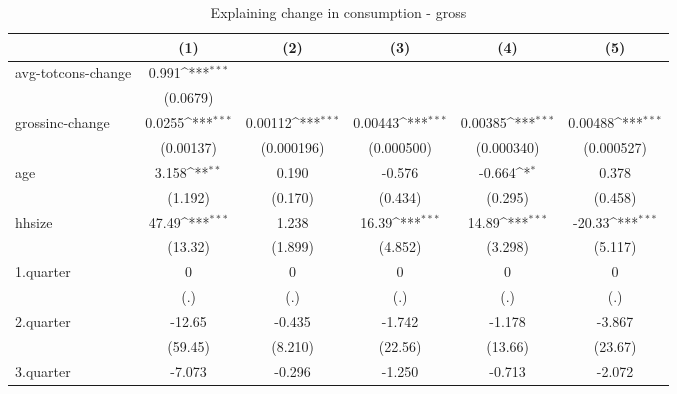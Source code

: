 \begin{table}[!h]\centering
\def\sym#1{\ifmmode^{#1}\else\(^{#1}\)\fi}
\caption{\label{tab:2.1B-deltacons-gross} Explaining change in consumption - gross}
\begin{tabular}{l*{5}{c}}
\hline\hline
            &\multicolumn{1}{c}{(1)}         &\multicolumn{1}{c}{(2)}         &\multicolumn{1}{c}{(3)}         &\multicolumn{1}{c}{(4)}         &\multicolumn{1}{c}{(5)}         \\
\hline
avg-totcons-change&       0.991\sym{***}&                     &                     &                     &                     \\
            &    (0.0679)         &                     &                     &                     &                     \\
grossinc-change&      0.0255\sym{***}&     0.00112\sym{***}&     0.00443\sym{***}&     0.00385\sym{***}&     0.00488\sym{***}\\
            &   (0.00137)         &  (0.000196)         &  (0.000500)         &  (0.000340)         &  (0.000527)         \\
age         &       3.158\sym{**} &       0.190         &      -0.576         &      -0.664\sym{*}  &       0.378         \\
            &     (1.192)         &     (0.170)         &     (0.434)         &     (0.295)         &     (0.458)         \\
hhsize      &       47.49\sym{***}&       1.238         &       16.39\sym{***}&       14.89\sym{***}&      -20.33\sym{***}\\
            &     (13.32)         &     (1.899)         &     (4.852)         &     (3.298)         &     (5.117)         \\
1.quarter   &           0         &           0         &           0         &           0         &           0         \\
            &         (.)         &         (.)         &         (.)         &         (.)         &         (.)         \\
2.quarter   &      -12.65         &      -0.435         &      -1.742         &      -1.178         &      -3.867         \\
            &     (59.45)         &     (8.210)         &     (22.56)         &     (13.66)         &     (23.67)         \\
3.quarter   &      -7.073         &      -0.296         &      -1.250         &      -0.713         &      -2.072         \\

\end{tabular}
\end{table}
